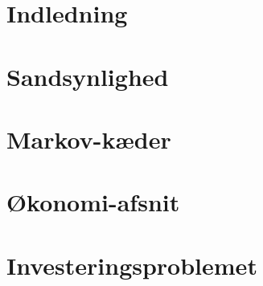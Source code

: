 

 




\chapter{Indledning} 
    

\chapter{Sandsynlighed}\label{kapitel:sandsynlighed}


%

\chapter{Markov-kæder}\label{Kap:MArkov-kæder}

\chapter{Økonomi-afsnit}

\chapter{Investeringsproblemet}






\cite{hoel1986introduction}
\cite{kaas2008modern}
\cite{oxford}


